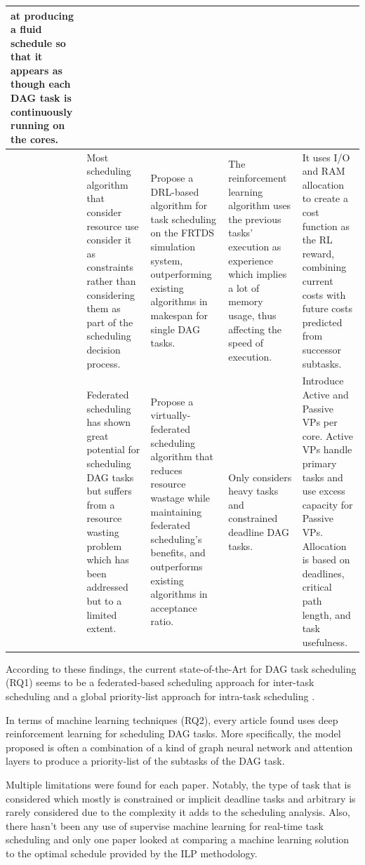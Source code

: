\begin{table}
\begin{tabular}[]{|p{0.15in}|p{1.6in}|p{1.6in}|p{1.6in}|p{1.6in}|}
        at producing a fluid schedule so that it appears as though each DAG task
        is continuously running on the cores. \\
        \hline
        \cite{GuanFRTDS2020RL} & Most scheduling algorithm that consider
        resource use consider it as constraints rather than considering them 
        as part of the scheduling decision process. & Propose a DRL-based algorithm for task scheduling on the FRTDS simulation system, outperforming
         existing algorithms in makespan for single DAG tasks. & The reinforcement learning 
        algorithm uses the previous tasks' execution as experience
        which implies a lot of memory usage,
        thus affecting the speed of execution. & It uses I/O and RAM allocation to create a cost function as the RL reward, combining current 
        costs with future costs predicted from successor subtasks. \\
        \hline
        \cite{JiangVirtuallyFederatedSched2021} & Federated scheduling 
        has shown great potential for scheduling DAG tasks but 
        suffers from a resource wasting problem which has 
        been addressed but to a limited extent. & Propose a virtually-federated scheduling algorithm that reduces 
        resource wastage while maintaining federated scheduling's benefits, and outperforms existing algorithms in acceptance ratio. 
        & Only considers heavy tasks and constrained deadline DAG tasks. 
        & Introduce Active and Passive VPs per core. Active VPs handle primary 
        tasks and use excess capacity for 
        Passive VPs. Allocation is based on deadlines, critical path length, and task usefulness.\\
        \hline
    \end{tabular}
\end{table}

According to these findings,
the current state-of-the-Art for DAG task scheduling (RQ1)
seems to be a federated-based scheduling approach for inter-task 
scheduling and a global priority-list approach for intra-task scheduling
\cite{He2023DegreeOfParallelism}\cite{Zhao2022DAGsched}.

In terms of machine learning techniques (RQ2), every article found uses 
deep reinforcement learning for scheduling DAG tasks.
More specifically, the model proposed is often a combination
of a kind of graph neural network and attention layers 
to produce a priority-list of the subtasks of the DAG task.

Multiple limitations were found for each 
paper. Notably, the type of task that is 
considered which mostly is constrained or implicit deadline tasks
and arbitrary is rarely considered due to the complexity it adds
to the scheduling analysis.
Also, there hasn't been any use of supervise machine learning 
for real-time task scheduling
and only one paper looked at comparing a machine learning solution
to the optimal schedule provided by the ILP methodology.